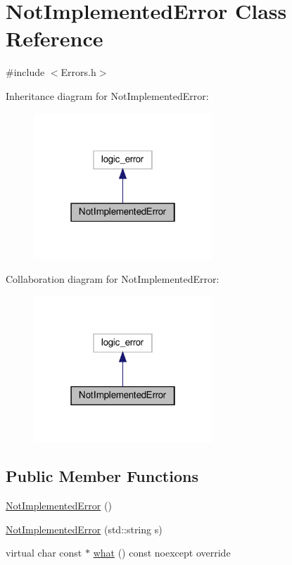 \hypertarget{class_not_implemented_error}{}\section{Not\+Implemented\+Error Class Reference}
\label{class_not_implemented_error}


{\ttfamily \#include $<$Errors.\+h$>$}



Inheritance diagram for Not\+Implemented\+Error\+:\nopagebreak
\begin{figure}[H]
\begin{center}
\leavevmode
\includegraphics[width=190pt]{class_not_implemented_error__inherit__graph}
\end{center}
\end{figure}


Collaboration diagram for Not\+Implemented\+Error\+:\nopagebreak
\begin{figure}[H]
\begin{center}
\leavevmode
\includegraphics[width=190pt]{class_not_implemented_error__coll__graph}
\end{center}
\end{figure}
\subsection*{Public Member Functions}
\begin{DoxyCompactItemize}
\item 
\hyperlink{class_not_implemented_error_a715a224ab50633f41010e22d2033e6d8}{Not\+Implemented\+Error} ()
\item 
\hyperlink{class_not_implemented_error_a0fc1c5e8d9ea2da187ca3ddf0e65e8e9}{Not\+Implemented\+Error} (std\+::string s)
\item 
virtual char const  $\ast$ \hyperlink{class_not_implemented_error_a338a926dcaa356ac1b33cc0d7a093351}{what} () const noexcept override
\end{DoxyCompactItemize}


